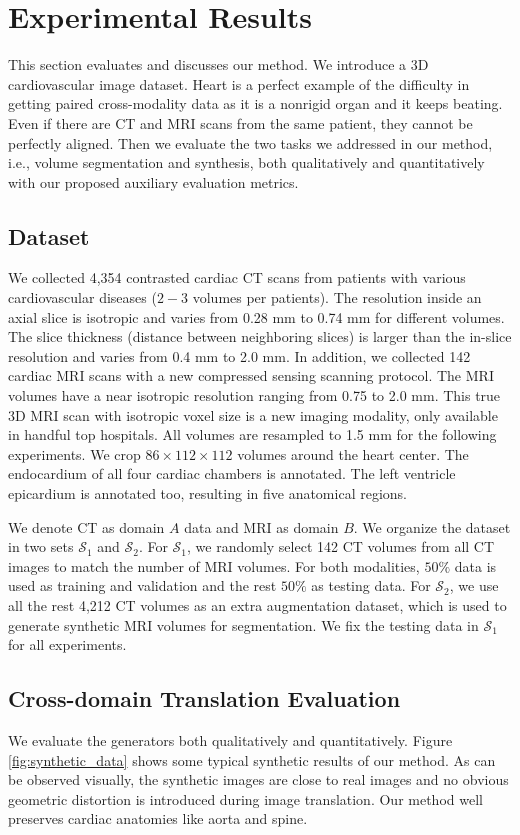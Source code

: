 \documentclass[10pt,twocolumn,letterpaper]{article}
\begin{document}
\section{Experimental Results}
This section evaluates and discusses our method. We introduce a 3D cardiovascular image dataset. Heart is a perfect example of the difficulty in getting paired cross-modality data as it is a nonrigid organ and it keeps beating. Even if there are CT and MRI scans from the same patient, they cannot be perfectly aligned. 
Then we evaluate the two tasks we addressed in our method, i.e., volume segmentation and synthesis, both qualitatively and quantitatively with our proposed auxiliary evaluation metrics.

\subsection{Dataset}
We collected 4,354 contrasted cardiac CT scans from patients with various cardiovascular diseases ($2{-}3$ volumes per patients).
The resolution inside an axial slice is isotropic and varies from 0.28 mm to 0.74 mm for different volumes.
The slice thickness (distance between neighboring slices) is larger than the in-slice resolution and varies from 0.4 mm to 2.0 mm.
In addition, we collected 142 cardiac MRI scans with a new compressed sensing scanning protocol.  
The MRI volumes have a near isotropic resolution ranging from 0.75 to 2.0 mm. This true 3D MRI scan with isotropic voxel size is a new imaging modality, only available in handful top hospitals.
All volumes are resampled to 1.5 mm for the following experiments.
We crop $86{\times}112{\times}112$ volumes around the heart center.
The endocardium of all four cardiac chambers is annotated. The left ventricle epicardium is annotated too, resulting in five anatomical regions.

We denote CT as domain $A$ data and MRI as domain $B$.  We organize the dataset in two sets $\mathcal{S}_1$ and $\mathcal{S}_2$. For $\mathcal{S}_1$, we randomly select 142 CT volumes from all CT images to match the number of MRI volumes. For both modalities, $50\%$ data is used as training and validation and the rest $50 \%$ as testing data. 
For $\mathcal{S}_2$, we use all the rest 4,212 CT volumes as an extra augmentation dataset, which is used to generate synthetic MRI volumes for segmentation.
We fix the testing data in $\mathcal{S}_1$ for all experiments.


\subsection{Cross-domain Translation Evaluation}
We evaluate the generators both qualitatively and quantitatively.
Figure \ref{fig:synthetic_data} shows some typical synthetic results of our method.
As can be observed visually, the synthetic images are close to real images and no obvious geometric distortion is introduced during image translation. Our method well preserves cardiac anatomies like aorta and spine. 
                                     
\end{document}
